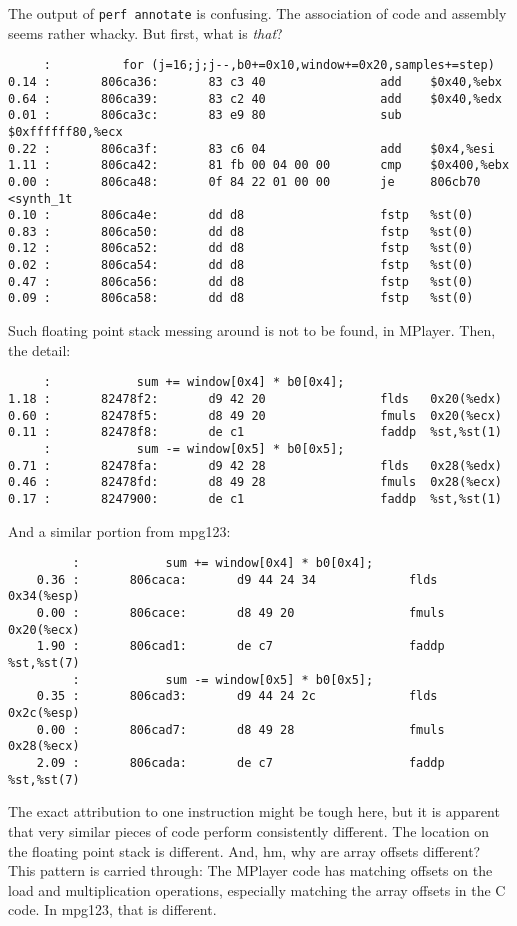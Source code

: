 \documentclass[a4paper,12pt]{scrartcl}
\begin{document}
The output of \verb:perf annotate: is confusing. The association of code and assembly seems rather whacky. But first, what is {\em that}?
\begin{verbatim}
     :          for (j=16;j;j--,b0+=0x10,window+=0x20,samples+=step)
0.14 :       806ca36:       83 c3 40                add    $0x40,%ebx
0.64 :       806ca39:       83 c2 40                add    $0x40,%edx
0.01 :       806ca3c:       83 e9 80                sub    $0xffffff80,%ecx
0.22 :       806ca3f:       83 c6 04                add    $0x4,%esi
1.11 :       806ca42:       81 fb 00 04 00 00       cmp    $0x400,%ebx
0.00 :       806ca48:       0f 84 22 01 00 00       je     806cb70 <synth_1t
0.10 :       806ca4e:       dd d8                   fstp   %st(0)
0.83 :       806ca50:       dd d8                   fstp   %st(0)
0.12 :       806ca52:       dd d8                   fstp   %st(0)
0.02 :       806ca54:       dd d8                   fstp   %st(0)
0.47 :       806ca56:       dd d8                   fstp   %st(0)
0.09 :       806ca58:       dd d8                   fstp   %st(0)
\end{verbatim}
Such floating point stack messing around is not to be found, in MPlayer. Then, the detail:
\begin{verbatim}
     :            sum += window[0x4] * b0[0x4];
1.18 :       82478f2:       d9 42 20                flds   0x20(%edx)
0.60 :       82478f5:       d8 49 20                fmuls  0x20(%ecx)
0.11 :       82478f8:       de c1                   faddp  %st,%st(1)
     :            sum -= window[0x5] * b0[0x5];
0.71 :       82478fa:       d9 42 28                flds   0x28(%edx)
0.46 :       82478fd:       d8 49 28                fmuls  0x28(%ecx)
0.17 :       8247900:       de c1                   faddp  %st,%st(1)
\end{verbatim}
And a similar portion from mpg123:
\begin{verbatim}
         :            sum += window[0x4] * b0[0x4];
    0.36 :       806caca:       d9 44 24 34             flds   0x34(%esp)
    0.00 :       806cace:       d8 49 20                fmuls  0x20(%ecx)
    1.90 :       806cad1:       de c7                   faddp  %st,%st(7)
         :            sum -= window[0x5] * b0[0x5];
    0.35 :       806cad3:       d9 44 24 2c             flds   0x2c(%esp)
    0.00 :       806cad7:       d8 49 28                fmuls  0x28(%ecx)
    2.09 :       806cada:       de c7                   faddp  %st,%st(7)
\end{verbatim}
The exact attribution to one instruction might be tough here, but it is apparent that very similar pieces of code perform consistently different. The location on the floating point stack is different.
And, hm, why are array offsets different?
This pattern is carried through: The MPlayer code has matching offsets on the load and multiplication operations, especially matching the array offsets in the C code.
In mpg123, that is different.
\end{document}
